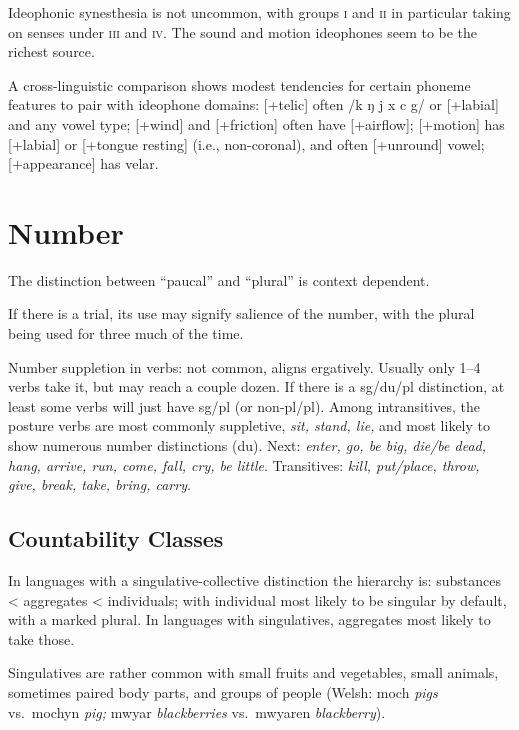 \documentclass[11pt]{article}
\newcommand{\I}[1]{\textsc{#1}}   %
\begin{document}
{Ideophonic synesthesia is not uncommon, with groups \I{i} and \I{ii}
in particular taking on senses under \I{iii} and \I{iv}.  The sound
and motion ideophones seem to be the richest source.

A cross-linguistic comparison shows modest tendencies for certain
phoneme features to pair with ideophone domains: [+telic] often /k ŋ j
x c g/ or [+labial] and any vowel type; [+wind] and [+friction] often
have [+airflow]; [+motion] has [+labial] or [+tongue resting] (i.e.,
non-coronal), and often [+unround] vowel; [+appearance] has velar.

\section{Number}
The distinction between ``paucal'' and ``plural'' is context
dependent. 

If there is a trial, its use may signify salience of the number, with
the plural being used for three much of the time.

Number suppletion in verbs: not common, aligns ergatively.  Usually
only 1--4 verbs take it, but may reach a couple dozen.  If there is a
sg/du/pl distinction, at least some verbs will just have sg/pl (or
non-pl/pl).  Among intransitives, the posture verbs are most commonly
suppletive, \textit{sit, stand, lie,} and most likely to show numerous
number distinctions (du).  Next: \textit{enter, go, be big, die/be
  dead, hang, arrive, run, come, fall, cry, be little}.  Transitives:
\textit{kill, put/place, throw, give, break, take, bring, carry}.


\subsection{Countability Classes}  In languages with a
singulative-collective distinction the hierarchy is: substances <
aggregates < individuals; with individual most likely to be singular
by default, with a marked plural.  In languages with singulatives,
aggregates most likely to take those.

Singulatives are rather common with small fruits and vegetables, small
animals, sometimes paired body parts, and groups of people (Welsh:
moch \textit{pigs} vs.\ mochyn \textit{pig;} mwyar
\textit{blackberries} vs.\ mwyaren \textit{blackberry}).


}
\end{document}
